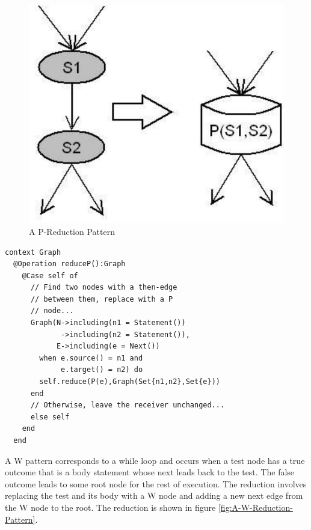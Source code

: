 %
\begin{figure}
\begin{center}

\includegraphics[width=12cm]{LanguageEngineering/Commands/Images/P}

\caption{A P-Reduction Pattern\label{fig:A-P-Reduction-Pattern}}

\end{center}
\end{figure}


\begin{lstlisting}
context Graph
  @Operation reduceP():Graph
    @Case self of
      // Find two nodes with a then-edge
      // between them, replace with a P
      // node...
      Graph(N->including(n1 = Statement())
             ->including(n2 = Statement()),
            E->including(e = Next())
        when e.source() = n1 and
             e.target() = n2) do
        self.reduce(P(e),Graph(Set{n1,n2},Set{e}))
      end
      // Otherwise, leave the receiver unchanged...
      else self
    end
  end
\end{lstlisting}A W pattern corresponds to a
while loop and occurs when a test node has a true outcome that is
a body statement whose next leads back to the test. The false outcome
leads to some root node for the rest of execution. The reduction involves
replacing the test and its body with a W node
and adding a new next edge from the W node
to the root. The reduction is shown in figure \ref{fig:A-W-Reduction-Pattern}.

